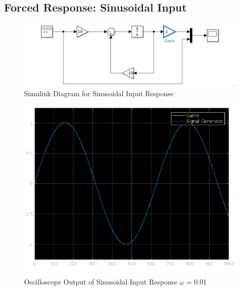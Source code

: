 \documentclass[12pt]{article}
\begin{document}
		\subsection{Forced Response: Sinusoidal Input}
			\begin{figure}[H]
				\centering
				\includegraphics[width=1\linewidth]{"Code/Fig/part2_3_slx.png"} %
				\caption{Simulink Diagram for Sinusoidal Input Response}
				\label{fig:slx_sine_input_diagram}
			\end{figure}
			\begin{figure}[H]
				\centering
				\includegraphics[width=1\linewidth]{"Code/Fig/sine_input_output_w_0_01.png"} 
				\caption{Oscilloscope Output of Sinusoidal Input Response $\omega$ = 0.01}
				\label{fig:slx_sine_input_output_w_0_01}
			\end{figure}
		
\end{document}
